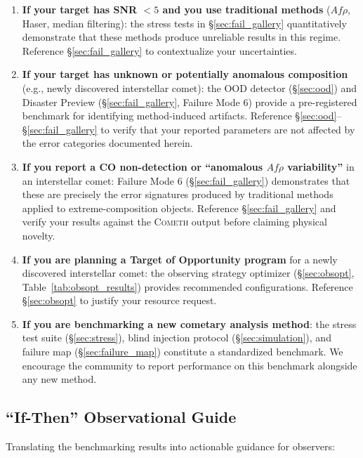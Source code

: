 \documentclass[usenatbib]{mnras}
\begin{document}
\begin{enumerate}
    \item \textbf{If your target has SNR $<5$ and you use traditional methods} ($Af\rho$, Haser, median filtering): the stress tests in \S\ref{sec:fail_gallery} quantitatively demonstrate that these methods produce unreliable results in this regime. Reference \S\ref{sec:fail_gallery} to contextualize your uncertainties.
    \item \textbf{If your target has unknown or potentially anomalous composition} (e.g., newly discovered interstellar comet): the OOD detector (\S\ref{sec:ood}) and Disaster Preview (\S\ref{sec:fail_gallery}, Failure Mode 6) provide a pre-registered benchmark for identifying method-induced artifacts. Reference \S\ref{sec:ood}--\S\ref{sec:fail_gallery} to verify that your reported parameters are not affected by the error categories documented herein.
    \item \textbf{If you report a CO non-detection or ``anomalous $Af\rho$ variability''} in an interstellar comet: Failure Mode 6 (\S\ref{sec:fail_gallery}) demonstrates that these are precisely the error signatures produced by traditional methods applied to extreme-composition objects. Reference \S\ref{sec:fail_gallery} and verify your results against the \textsc{Cometh} output before claiming physical novelty.
    \item \textbf{If you are planning a Target of Opportunity program} for a newly discovered interstellar comet: the observing strategy optimizer (\S\ref{sec:obsopt}, Table~\ref{tab:obsopt_results}) provides recommended configurations. Reference \S\ref{sec:obsopt} to justify your resource request.
    \item \textbf{If you are benchmarking a new cometary analysis method}: the stress test suite (\S\ref{sec:stress}), blind injection protocol (\S\ref{sec:simulation}), and failure map (\S\ref{sec:failure_map}) constitute a standardized benchmark. We encourage the community to report performance on this benchmark alongside any new method.
\end{enumerate}

\subsection{``If-Then'' Observational Guide}\label{sec:ifthen}

Translating the benchmarking results into actionable guidance for observers:
\end{document}
